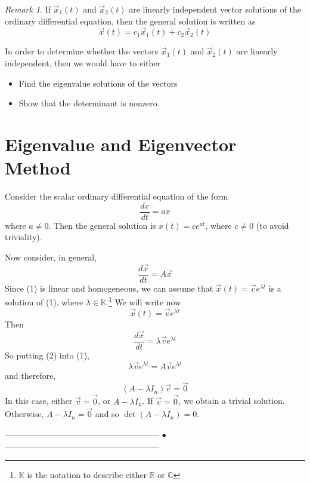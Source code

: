 \documentclass[11pt]{amsart}
\theoremstyle{definition}\newtheorem{definition}{Definition}
\theoremstyle{definition}\newtheorem{notation}{Notation}
\theoremstyle{definition}\newtheorem{example}{Example}
\theoremstyle{theorem}\newtheorem{theorem}{Theorem}
\theoremstyle{theorem}\newtheorem{corollary}{Corollary}
\theoremstyle{theorem}\newtheorem{proposition}{Proposition}
\theoremstyle{theorem}\newtheorem{lemma}{Lemma}
\theoremstyle{theorem}\newtheorem{question}{Question}
\theoremstyle{remark}\newtheorem{remark}{Remark}
\newcommand{\K}{\mathbb{K}}
\newcommand{\C}{\mathbb{C}}
\newcommand{\R}{\mathbb{R}}
\begin{document}
\begin{remark}
    If $\vec{x}_1(t)$ and $\vec{x}_2(t)$ are linearly independent vector solutions of the ordinary differential equation, then the general solution is written as
    \begin{equation*}
        \vec{x}(t) = c_1\vec{x}_1(t) + c_2\vec{x}_2(t)
    \end{equation*}
\end{remark}

In order to determine whether the vectors $\vec{x}_1(t)$ and $\vec{x}_2(t)$ are linearly independent, then we would have to either
\begin{itemize}
    \item Find the eigenvalue solutions of the vectors
    \item Show that the determinant is nonzero.
\end{itemize}

\section{Eigenvalue and Eigenvector Method}

Consider the scalar ordinary differential equation of the form
\begin{equation*}
    \frac{dx}{dt} = ax
\end{equation*}
where $a \neq 0$. Then the general solution is $x(t) = ce^{at}$, where $c \neq 0$ (to avoid triviality).

Now consider, in general, 
\begin{equation}
    \frac{d\vec{x}}{dt} = A\vec{x}
\end{equation}
Since (1) is linear and homogeneous, we can assume that $\vec{x}(t) = \vec{c}e^{\lambda t}$ is a solution of (1), where $\lambda \in \K$.\footnote{$\K$ is the notation to describe either $\R$ or $\C$} We will write now
\begin{equation}
    \vec{x}(t) = \vec{v}e^{\lambda t}
\end{equation}
Then
\begin{equation*}
    \frac{d\vec{x}}{dt} = \lambda \vec{v} e^{\lambda t}
\end{equation*}
So putting (2) into (1),
\begin{equation*}
    \lambda \vec{v}e^{\lambda t} = A\vec{v}e^{\lambda t}
\end{equation*}
and therefore,
\begin{equation*}
    (A - \lambda I_n)\vec{v} = \vec{0}
\end{equation*}
In this case, either $\vec{v} = \vec{0}$, or $A - \lambda I_n$. If $\vec{v} = \vec{0}$, we obtain a trivial solution. Otherwise, $A - \lambda I_n = \vec{0}$ and so $\det(A - \lambda I_n) = 0$.

\begin{center}
    -------------------------------------------------------- $\bullet$ --------------------------------------------------------
\end{center}
\end{document}

